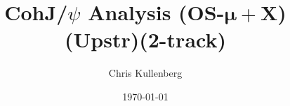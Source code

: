 \title{CohJ/$\psi$ Analysis (\textbf{OS}-$\boldsymbol{\mu+}$\textbf{X})(\textbf{Upstr})(\textbf{2-track})}
\author{Chris Kullenberg}
\date{\today}
